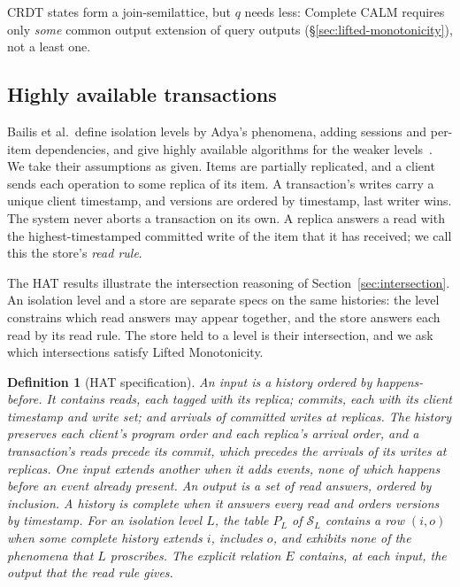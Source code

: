\documentclass[sigconf]{cidr-2027}
\newtheorem{definition}{Definition}
\theoremstyle{remark}
\newcommand{\inrel}{extends\xspace}          %
\newcommand{\outnoun}{output extension\xspace}%
\newcommand{\Spec}{\mathcal{S}}
\begin{document}
CRDT states form a join-semilattice, but $q$ needs less:
Complete CALM requires only \emph{some} common \outnoun of query outputs
(\S\ref{sec:lifted-monotonicity}), not a least one.

\subsection{Highly available transactions}
\label{sec:hat-instance}

Bailis et al.\ define isolation levels by Adya's phenomena, adding sessions and
per-item dependencies, and give highly available algorithms for the weaker
levels~\cite{bailis2013hat,adya1999weakconsistency}. We take their
assumptions as given. Items are partially replicated, and a client sends each
operation to some replica of its item. A transaction's writes carry a unique
client timestamp, and versions are ordered by timestamp, last writer wins. The system never aborts a transaction on its own. A replica answers a read
with the highest-timestamped committed write of the item that it has received;
we call this the store's \emph{read rule}.

The HAT results illustrate the intersection reasoning of
Section~\ref{sec:intersection}. An isolation level and a store are separate
specs on the same histories: the level constrains which read answers may
appear together, and the store answers each read by its read rule. The store
held to a level is their intersection, and we ask which intersections satisfy
Lifted Monotonicity.

\begin{definition}[HAT specification]
\label{def:hat-spec}
An input is a history ordered by happens-before. It contains reads, each
tagged with its replica; commits, each with its client timestamp and write set; and arrivals
of committed writes at replicas. The history preserves
each client's program order and each replica's arrival order, and a
transaction's reads precede its commit, which precedes the arrivals of its
writes at replicas. \textcolor{reviewed}{One input \inrel another when it adds events, none of which happens before an
event already present.} \textcolor{reviewed}{An output is a set of read
answers, ordered by inclusion.} \textcolor{reviewed}{A history is \emph{complete} when it answers
every read and orders versions by timestamp.} \textcolor{reviewed}{For an isolation level $L$, the
table $P_L$ of $\Spec_L$ contains a row $(i,o)$ when some complete history
extends $i$, includes $o$, and exhibits none of the phenomena that $L$
proscribes.} \textcolor{reviewed}{The explicit relation $E$ contains, at each input, the output that
the read rule gives.}
\end{definition}
\end{document}
